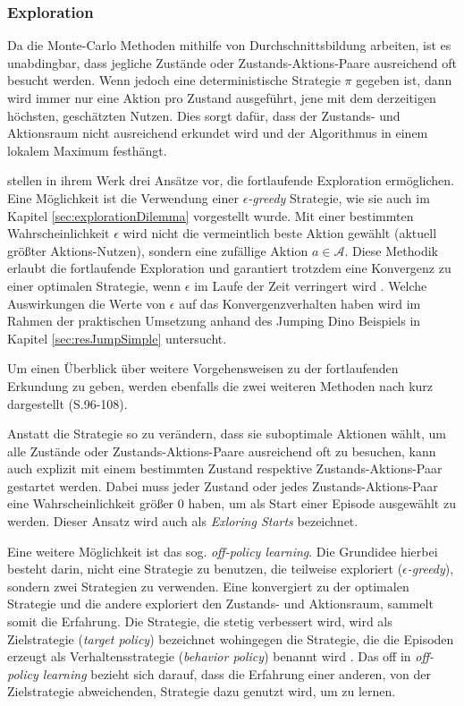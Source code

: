 \subsubsection{Exploration}\label{sec:exploration}
Da die Monte-Carlo Methoden mithilfe von Durchschnittsbildung arbeiten, ist es unabdingbar, dass jegliche Zustände oder Zustands-Aktions-Paare ausreichend oft besucht werden. Wenn jedoch eine deterministische Strategie $\pi$ gegeben ist, dann wird immer nur eine Aktion pro Zustand ausgeführt, jene mit dem derzeitigen höchsten, geschätzten Nutzen. Dies sorgt dafür, dass der Zustands- und Aktionsraum nicht ausreichend erkundet wird und der Algorithmus in einem lokalem Maximum festhängt.
\par 
\cite{Sutton1998} stellen in ihrem Werk drei Ansätze vor, die fortlaufende Exploration ermöglichen. Eine Möglichkeit ist die Verwendung einer $\epsilon$\textit{-greedy} Strategie, wie sie auch im Kapitel \ref{sec:explorationDilemma} vorgestellt wurde. Mit einer bestimmten Wahrscheinlichkeit $\epsilon$ wird nicht die vermeintlich beste Aktion gewählt (aktuell größter  Aktions-Nutzen), sondern eine zufällige Aktion $a \in \mathcal{A}$. Diese Methodik erlaubt die fortlaufende Exploration und garantiert trotzdem eine Konvergenz zu einer optimalen Strategie, wenn $\epsilon$ im Laufe der Zeit verringert wird \cite[S.~201]{Sutton1998}. Welche Auswirkungen die Werte von $\epsilon$ auf das Konvergenzverhalten haben wird im Rahmen der praktischen Umsetzung anhand des Jumping Dino Beispiels in Kapitel \ref{sec:resJumpSimple} untersucht.
\par 
Um einen Überblick über weitere Vorgehensweisen zu der fortlaufenden Erkundung zu geben, werden ebenfalls die zwei weiteren Methoden nach \cite{Sutton1998} kurz dargestellt (S.96-108). 
\par 
Anstatt die Strategie so zu verändern, dass sie suboptimale Aktionen wählt, um alle Zustände oder Zustands-Aktions-Paare ausreichend oft zu besuchen, kann auch explizit mit einem bestimmten Zustand respektive Zustands-Aktions-Paar gestartet werden. Dabei muss jeder Zustand oder jedes Zustands-Aktions-Paar eine Wahrscheinlichkeit größer 0 haben, um als Start einer Episode ausgewählt zu werden. Dieser Ansatz wird auch als \textit{Exloring Starts} bezeichnet.
\par
Eine weitere Möglichkeit ist das sog. \textit{off-policy learning}. Die Grundidee hierbei besteht darin, nicht eine Strategie zu benutzen, die teilweise exploriert ($\epsilon$\textit{-greedy}), sondern zwei Strategien zu verwenden. Eine konvergiert zu der optimalen Strategie und die andere exploriert den Zustands- und Aktionsraum, sammelt somit die Erfahrung. Die Strategie, die stetig verbessert wird, wird als Zielstrategie (\textit{target policy}) bezeichnet wohingegen die Strategie, die die Episoden erzeugt als Verhaltensstrategie (\textit{behavior policy}) benannt wird \cite[S.~103]{Sutton1998}. Das \glqq off \grqq{} in \textit{off-policy learning} bezieht sich darauf, dass die Erfahrung einer anderen, von der Zielstrategie abweichenden, Strategie dazu genutzt wird, um zu lernen.
\pagebreak
